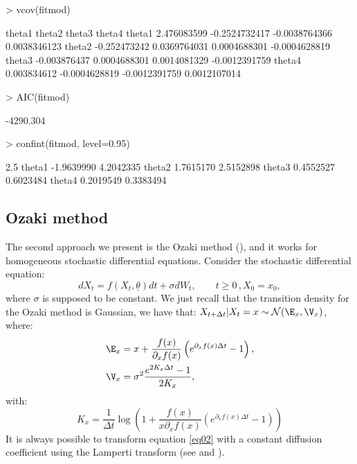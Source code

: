 \begin{Schunk}
\begin{Sinput}
> vcov(fitmod)
\end{Sinput}
\begin{Soutput}
             theta1        theta2        theta3        theta4
theta1  2.476083599 -0.2524732417 -0.0038764366  0.0038346123
theta2 -0.252473242  0.0369764031  0.0004688301 -0.0004628819
theta3 -0.003876437  0.0004688301  0.0014081329 -0.0012391759
theta4  0.003834612 -0.0004628819 -0.0012391759  0.0012107014
\end{Soutput}
\begin{Sinput}
> AIC(fitmod)
\end{Sinput}
\begin{Soutput}
[1] -4290.304
\end{Soutput}
\begin{Sinput}
> confint(fitmod, level=0.95)
\end{Sinput}
\begin{Soutput}
            2.5 %
theta1 -1.9639990 4.2042335
theta2  1.7615170 2.5152898
theta3  0.4552527 0.6023484
theta4  0.2019549 0.3383494
\end{Soutput}
\end{Schunk}

\subsection{Ozaki method}

The second approach we present is the Ozaki method (\citet{Ozaki1992,ShojiandOzaki1997}), and it works for homogeneous stochastic differential equations. Consider the stochastic differential
equation:
\begin{equation}\label{eq10}
  dX_{t}= f(X_{t},\underline{\theta}) dt + \sigma dW_{t}, \quad \quad t \geq 0 \, , X_{0} = x_{0},
\end{equation}
where $\sigma$ is supposed to be constant. We just recall that the transition density for the Ozaki method is Gaussian, we have that: $X_{t+\Delta t}|X_{t} = x \sim \mathcal{N}(\E_{x},\V_{x})$, where:
\begin{align}\label{eq11}
  \E_{x} &= x + \frac{f(x)}{\partial_{x} f(x)} \left( e^{\partial_{x} f(x) \Delta t} - 1 \right), \\
  \V_{x} &= \sigma^{2} \frac{e^{2K_{x} \Delta t} -1}{2K_{x}},
\end{align}
with:
\begin{equation*}
  K_{x} = \frac{1}{\Delta t} \log \left(1+\frac{f(x)}{x\partial_{x}f(x)}\left(e^{\partial_{x}f(x) \Delta t}-1\right) \right)
\end{equation*}
It is always possible to transform equation \eqref{eq02} with a constant diffusion coefficient using the Lamperti transform (see \cite{ShojiandOzaki1998,Florens1999,AitSahalia2002} and \citet[p. 40]{Stefano2008}).

